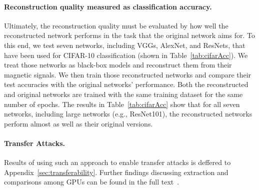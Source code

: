 \documentclass[12pt]{report}
\begin{document}
\begin{table}[t]
\centering
\caption{Model extraction accuracy on CIFAR-10 }\label{tab:cifarAcc}
\vspace{-4mm}
\end{table}

\paragraph{Reconstruction quality measured as classification accuracy.}
Ultimately, the reconstruction quality must be evaluated
by how well the reconstructed network performs in the task that the 
original network aims for. To this end, we test seven networks, including VGGs,
AlexNet, and ResNets, that have been used for CIFAR-10 classification (shown in
Table~\ref{tab:cifarAcc}). 
We treat those networks as black-box models and reconstruct them from their magnetic signals. 
We then train those reconstructed networks and compare their test accuracies with the original networks' performance.
Both the reconstructed and original networks are trained with the same training dataset for the same number of epochs. 
The results in Table~\ref{tab:cifarAcc} show that for all seven networks, including large networks (e.g., ResNet101), the reconstructed networks perform almost as well as their original versions. 

\paragraph{Transfer Attacks.}
Results of using such an approach to enable transfer attacks is deffered to Appendix~\ref{sec:transferability}.
Further findings discussing extraction and comparisons among GPUs can be found in the full text~\cite{maia2021hear}. 
\end{document}
